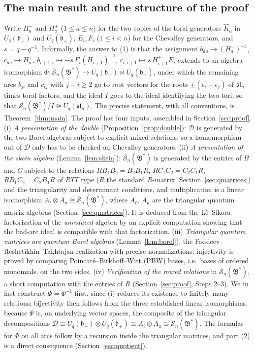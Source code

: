 \documentclass[11pt]{article}
\theoremstyle{remark}
\newcommand{\U}{U_q}
\newcommand{\slN}{\mathfrak{sl}_n}
\newcommand{\bp}{\mathfrak b_+}
\newcommand{\bm}{\mathfrak b_-}
\newcommand{\redS}{\overline{\mathcal S}_n}
\newcommand{\Bstar}{\mathfrak B^*}
\newcommand{\ot}{\otimes}
\newcommand{\cD}{\mathcal D}
\begin{document}
\subsection{The main result and the structure of the proof}\label{sec:strategy}

Write $H^-_a$ and $H^+_a$ ($1\le a\le n$) for the two copies of the
toral generators $\hat K_a$ in $\U(\bm)$ and $\U(\bp)$, $E_i,F_i$
($1\le i<n$) for the Chevalley generators, and $s=q-q^{-1}$.
Informally, the answer to (1) is that the assignment
$b_{aa}\mapsto(H^-_a)^{-1}$, $c_{aa}\mapsto H^+_a$,
$b_{i+1,i}\mapsto -s\,F_i(H^-_{i+1})^{-1}$,
$c_{i,i+1}\mapsto s\,H^+_{i+1}E_i$
extends to an algebra isomorphism
$\Phi:\redS(\Bstar)\to\U(\bm)\bowtie\U(\bp)$, under which the remaining
arcs $b_{ji}$ and $c_{ij}$ with $j-i\ge2$ go to root vectors for the
roots $\pm(\epsilon_i-\epsilon_j)$ of $\slN$ times toral factors, and
the ideal $I$ goes to the ideal identifying the two tori, so that
$\redS(\Bstar)/I\cong\U(\slN)$. The precise statement, with all
conventions, is Theorem~\ref{thm:main}.
The proof has four inputs, assembled in Section~\ref{sec:proof}.
(i) \emph{A presentation of the double} (Proposition~\ref{prop:double}):
$\cD$ is generated by the two Borel algebras subject to explicit mixed
relations, so a homomorphism out of $\cD$ only has to be checked on
Chevalley generators.
(ii) \emph{A presentation of the skein algebra} (Lemma~\ref{lem:skein}):
$\redS(\Bstar)$ is generated by the entries of $B$ and $C$ subject to
the relations $RB_1B_2=B_2B_1R$, $RC_1C_2=C_2C_1R$, $RB_1C_2=C_2B_1R$
of $RTT$ type ($R$ the standard $R$-matrix, Section~\ref{sec:qmatrices})
and the triangularity and determinant conditions, and multiplication is a
linear isomorphism $A_\ell\ot A_u\cong\redS(\Bstar)$, where $A_\ell$,
$A_u$ are the triangular quantum matrix algebras
(Section~\ref{sec:qmatrices}). It is deduced from the L\^e--Sikora
factorization \cite{LS} of the \emph{unreduced} algebra by an explicit
computation showing that the bad-arc ideal is compatible with that
factorization.
(iii) \emph{Triangular quantum matrices are quantum Borel algebras}
(Lemma~\ref{lem:borel}), the Faddeev--Reshetikhin--Takhtajan realization
\cite{FRT} with precise normalizations; injectivity is proved by
comparing Poincar\'e--Birkhoff--Witt (PBW) bases, i.e.\ bases of
ordered monomials, on the two sides.
(iv) \emph{Verification of the mixed relations} in $\redS(\Bstar)$, a
short computation with the entries of $R$ (Section~\ref{sec:proof},
Steps 2--3).
We in fact construct $\Psi=\Phi^{-1}$ first, since (i) reduces its
existence to finitely many relations; bijectivity then follows from
the three established linear isomorphisms, because $\Psi$ is, on
underlying vector spaces, the composite of the triangular
decompositions $\cD\cong\U(\bm)\ot\U(\bp)\cong
A_\ell\ot A_u\cong\redS(\Bstar)$. The formulas for $\Phi$ on all arcs
follow by a recursion inside the triangular matrices, and part (2) is a
direct consequence (Section~\ref{sec:quotient}).
\end{document}
